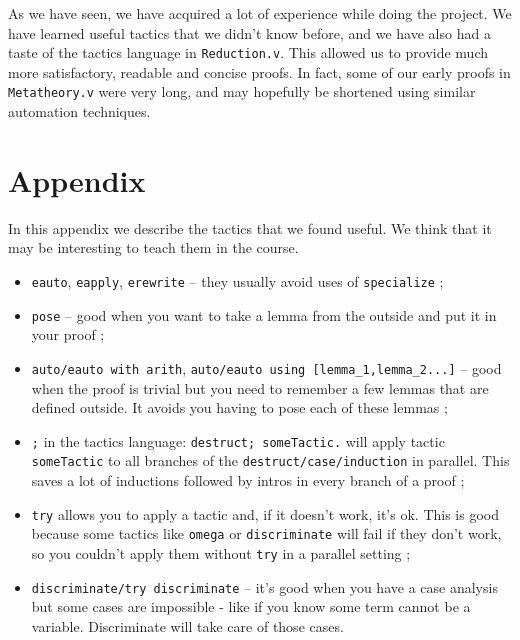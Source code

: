 \documentclass[a4paper,11pt]{article}
\begin{document}
As we have seen, we have acquired a lot of experience while doing the
project. We have learned useful tactics that we didn't know before,
and we have also had a taste of the tactics language in
\verb|Reduction.v|. This allowed us to provide much more satisfactory,
readable and concise proofs. In fact, some of our early proofs in
\verb|Metatheory.v| were very long, and may hopefully be shortened
using similar automation techniques.

\section*{Appendix}

In this appendix we describe the tactics that we found useful. We
think that it may be interesting to teach them in the course.

\begin{itemize}
\item \verb|eauto|, \verb|eapply|, \verb|erewrite| -- they usually
  avoid uses of \verb|specialize| ;
\item \verb|pose| -- good when you want to take a lemma from the outside and put
 it in your proof ;
\item \verb|auto/eauto with arith|,
  \verb|auto/eauto using [lemma_1,lemma_2...]| --
 good when the proof is trivial but you need to remember a few lemmas
 that are defined outside. It avoids you having to pose each of these lemmas ;
\item \verb|;| in the tactics language: \verb|destruct; someTactic.| will apply
  tactic \verb|someTactic| to all branches of the
  \verb|destruct/case/induction| in parallel. This saves a
 lot of inductions followed by intros in every branch of a proof ;
\item \verb|try| allows you to apply a tactic and, if it doesn't work, it's ok.
 This is good because some tactics like \verb|omega| or
 \verb|discriminate| will fail if they don't work, so you couldn't
 apply them without \verb|try| in a parallel setting ;
\item \verb|discriminate/try discriminate| -- it's good when you have
  a case analysis but some cases are impossible - like if you know
  some term cannot be a variable. Discriminate will take care of those
  cases.
\end{itemize}
\end{document}
